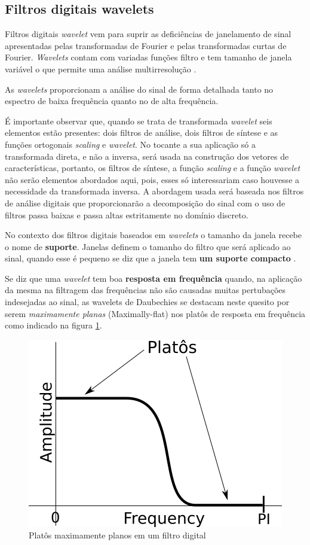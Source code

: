 \begin{myenv}{1.5}
			\subsection{Filtros digitais wavelets}
				\par Filtros digitais \textit{wavelet} vem para suprir as deficiências de janelamento de sinal apresentadas pelas transformadas de Fourier e pelas transformadas curtas de Fourier. \textit{Wavelets} contam com variadas funções filtro e tem tamanho de janela variável o que permite uma análise multirresolução \cite{Rod5254905}.
				
				\par As \textit{wavelets} proporcionam a análise do sinal de forma detalhada tanto no espectro de baixa frequência quanto no de alta frequência.
				
				\par É importante observar que, quando se trata de transformada \textit{wavelet} seis elementos estão presentes: dois filtros de análise, dois filtros de síntese e as funções ortogonais \textit{scaling} e \textit{wavelet}. No tocante a sua aplicação só a transformada direta, e não a inversa, será usada na construção dos vetores de características, portanto, os filtros de síntese, a função \textit{scaling} e a função \textit{wavelet} não serão elementos abordados aqui, pois, esses só interessariam caso houvesse a necessidade da transformada inversa. A abordagem usada será baseada nos filtros de análise digitais que proporcionarão a decomposição do sinal com o uso de filtros passa baixas e passa altas estritamente no domínio discreto.
	
				\par No contexto dos filtros digitais baseados em \textit{wavelets} o tamanho da janela recebe o nome de \textbf{suporte}. Janelas definem o tamanho do filtro que será aplicado ao sinal, quando esse é pequeno se diz que a janela tem \textbf{um suporte compacto} \cite{robi2003}.
			
				\par Se diz que uma \textit{wavelet} tem boa \textbf{resposta em frequência} quando, na aplicação da mesma na filtragem das frequências não são causadas muitas pertubações indesejadas ao sinal, as wavelets de Daubechies se destacam neste quesito por serem \textit{maximamente planas} (Maximally-flat) nos platôs de resposta em frequência como indicado na figura \ref{fig:daubechies}.

				\begin{figure}[h]
					\centering
					\includegraphics[width=0.3\linewidth]{images/daubechies}
					\caption{Platôs maximamente planos em um filtro digital}
					\label{fig:daubechies}
				\end{figure}


\end{myenv}

